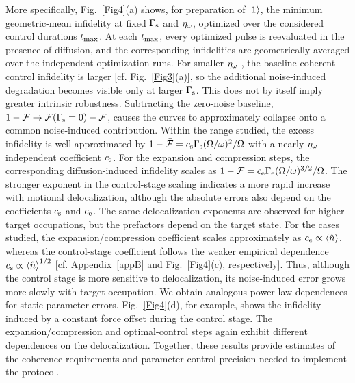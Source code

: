 \documentclass[reprint,prx,footinbib,floatfix,twocolumn,longbibliography,superscriptaddress]{revtex4-2}
\begin{document}
More specifically, Fig.~\ref{Fig4}(a) shows, for preparation of $\ket{1}$, the minimum geometric-mean infidelity at fixed $\Gamma_{\text{s}}$ and $\eta_\omega$, optimized over the considered control durations $t_\text{max}$.
At each $t_\text{max}$, every optimized pulse is reevaluated in the presence of diffusion, and the corresponding infidelities are geometrically averaged over the independent optimization runs.
For smaller $\eta_\omega$ , the baseline coherent-control infidelity is larger [cf. Fig.~\ref{Fig3}(a)], so the additional noise-induced degradation becomes visible only at larger $\Gamma_{\text{s}}$.
This does not by itself imply greater intrinsic robustness.
Subtracting the zero-noise baseline, $1-\bar{\mathcal{F}} \rightarrow \bar{\mathcal{F}} (\Gamma_{\text{s}} = 0) -\bar{\mathcal{F}} $, causes the curves to approximately collapse onto a common noise-induced contribution.
Within the range studied, the excess infidelity is well approximated by $1-\bar{\mathcal{F}} = c_{\text{s}} \Gamma_{\text{s}} (\Omega/ \omega)^{2} / \Omega $ with a nearly $\eta_\omega$-independent coefficient $c_{\text{s}}$.
For the expansion and compression steps, the corresponding diffusion-induced infidelity scales as $1-\mathcal{F} = c_{\text{e}} \Gamma_{\text{e}} (\Omega/ \omega)^{3/2} / \Omega $.
The stronger exponent in the control-stage scaling indicates a more rapid increase with motional delocalization, although the absolute errors also depend on the coefficients $c_{\text{s}}$ and $c_{\text{e}}$.
The same delocalization exponents are observed for higher target occupations, but the prefactors depend on the target state.
For the cases studied, the expansion/compression coefficient scales approximately as $c_{\text{e}} \propto \left<\hat{n}\right>$, whereas the control-stage coefficient follows the weaker empirical dependence $c_{\text{s}} \propto \left<\hat{n}\right>^{1/2}$ [cf. Appendix~\ref{appB} and Fig.~\ref{Fig4}(c), respectively].
Thus, although the control stage is more sensitive to delocalization, its noise-induced error grows more slowly with target occupation.
We obtain analogous power-law dependences for static parameter errors.
Fig.~\ref{Fig4}(d), for example, shows the infidelity induced by a constant force offset during the control stage.
The expansion/compression and optimal-control steps again exhibit different dependences on the delocalization.
Together, these results provide estimates of the coherence requirements and parameter-control precision needed to implement the protocol.
\end{document}
